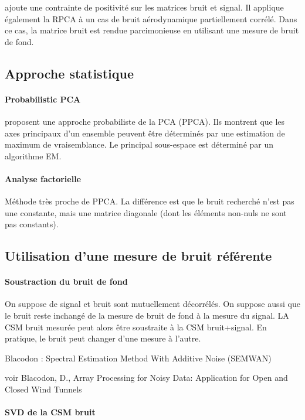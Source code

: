 \cite{Amailland2017phd} ajoute une contrainte de positivité sur les matrices bruit et signal. Il applique également la RPCA à un cas de bruit aérodynamique partiellement corrélé. Dans ce cas, la matrice bruit est rendue parcimonieuse en utilisant une mesure de bruit de fond. 

\subsection{Approche statistique}

\paragraph{\tbullet Probabilistic PCA}
\cite{Tipping1999} proposent une approche probabiliste de la PCA (PPCA). Ils montrent que les axes principaux d'un ensemble peuvent être déterminés par une estimation de maximum de vraisemblance. Le principal sous-espace est déterminé par un algorithme EM.

\paragraph{\tbullet Analyse factorielle}
Méthode très proche de PPCA. La différence est que le bruit recherché n'est pas une constante, mais une matrice diagonale (dont les éléments non-nuls ne sont pas constants).



\subsection{Utilisation d'une mesure de bruit référente}
 \paragraph{\tbullet Soustraction du bruit de fond} On suppose de signal et bruit sont mutuellement décorrélés. On suppose aussi que le bruit reste inchangé de la mesure de bruit de fond à la mesure du signal. LA CSM bruit mesurée peut alors être soustraite à la CSM bruit+signal. En pratique, le bruit peut changer d'une mesure à l'autre. 

Blacodon : Spectral Estimation Method With Additive Noise (SEMWAN)


voir Blacodon, D., Array Processing for Noisy Data: Application for Open and Closed Wind Tunnels

\paragraph{\tbullet SVD de la CSM bruit}

